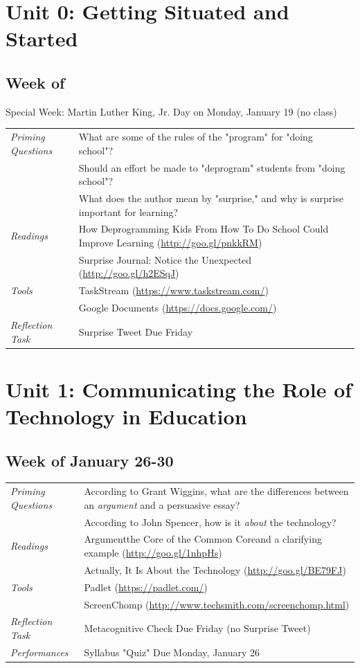 \documentclass{tufte-handout}
\newcommand{\tabpq}{\faQuestionSign\medspace\textit{Priming Questions}}
\newcommand{\tabread}{\faBook\medspace\textit{Readings}}
\newcommand{\tabtools}{\faWrench\medspace\textit{Tools}}
\newcommand{\tabtweet}{\faLightbulb\medspace\textit{Reflection Task} & Surprise Tweet Due Friday \\}
\newcommand{\tabcheck}{\faLightbulb\medspace\textit{Reflection Task} & Metacognitive Check Due Friday (no Surprise Tweet) \\}
\newcommand{\tabperformance}{\faTasks\medspace\textit{Performances}}
\newenvironment{tabsched}
	{\small
	\begin{tabular}{p{1.5in}p{5in}}
	\toprule}
	{\bottomrule
	\end{tabular}
	\normalsize}
\newenvironment{specweek}
	{\begin{center}
		\fontseries{b} \faBullhorn \medspace Special Week: }
		{\medspace \faBullhorn \fontseries{m}
	\end{center}}
\begin{document}
\begin{fullwidth}

\section{Unit 0: Getting Situated and Started}

\subsection{Week of}

\begin{specweek}
Martin Luther King, Jr. Day on Monday, January 19 (no class)
\end{specweek}

\begin{tabsched}
	\tabpq & What are some of the rules of the "program" for "doing school"? \\
	& Should an effort be made to "deprogram" students from "doing school"? \\
	& What does the author mean by "surprise," and why is surprise important for learning? \\
	\midrule
	\tabread & How Deprogramming Kids From How To Do School Could Improve Learning (\url{http://goo.gl/pnkkRM}) \\
	& Surprise Journal: Notice the Unexpected (\url{http://goo.gl/h2ESqJ}) \\
	\midrule
	\tabtools & TaskStream (\url{https://www.taskstream.com/}) \\
	& Google Documents (\url{https://docs.google.com/}) \\
	\midrule
	\tabtweet
\end{tabsched}

\section{Unit 1: Communicating the Role of Technology in Education}

\subsection{Week of January 26-30}

\begin{tabsched}
	\tabpq & According to Grant Wiggins, what are the differences between an \emph{argument} and a persuasive essay? \\
	& According to John Spencer, how is it \emph{about} the technology? \\
	\midrule
	\tabread & Argument\textemdash{}the Core of the Common Core\textemdash{}and a clarifying example (\url{http://goo.gl/1nhpHs}) \\
	& Actually, It Is About the Technology (\url{http://goo.gl/BE79FJ}) \\
	\midrule
	\tabtools & Padlet (\url{https://padlet.com/}) \\
	& ScreenChomp (\url{http://www.techsmith.com/screenchomp.html}) \\
	\midrule
	\tabcheck
	\midrule
	\tabperformance & Syllabus "Quiz" Due Monday, January 26 \\
\end{tabsched}


\end{fullwidth}
\end{document}
